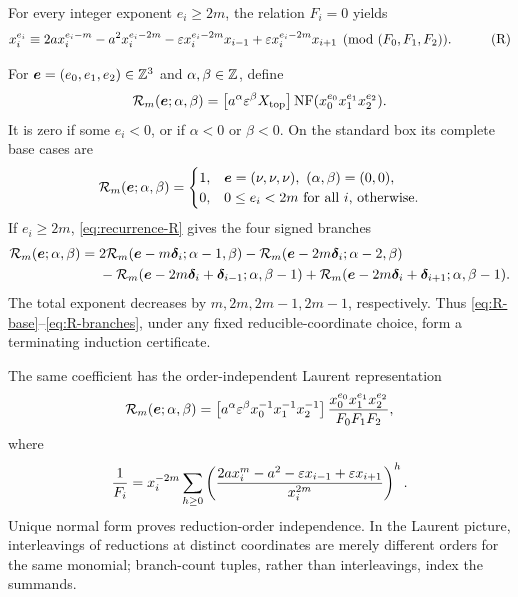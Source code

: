 \documentclass[11pt]{article}
\theoremstyle{definition}
\theoremstyle{remark}
\begin{document}
For every integer exponent \(e_i\ge2m\), the relation \(F_i=0\) yields
\begin{equation*}
\begin{aligned}
x_i^{e_i}\equiv{}&2a x_i^{e_i-m}-a^2x_i^{e_i-2m}
-\varepsilon x_i^{e_i-2m}x_{i-1}
+\varepsilon x_i^{e_i-2m}x_{i+1}
\pmod{(F_0,F_1,F_2)}.
\end{aligned}
\tag{R}\label{eq:recurrence-R}
\end{equation*}

For \(\boldsymbol{e}=(e_0,e_1,e_2)\in\mathbb{Z}^3\) and
\(\alpha,\beta\in\mathbb{Z}\), define
\begin{equation}
\mathcal{R}_m(\boldsymbol{e};\alpha,\beta)=
\left[a^\alpha\varepsilon^\beta X_{\mathrm{top}}\right]\operatorname{NF}(x_0^{e_0}x_1^{e_1}x_2^{e_2}).
\label{eq:R-state}
\end{equation}
It is zero if some \(e_i<0\), or if \(\alpha<0\) or \(\beta<0\).  On the
standard box its complete base cases are
\begin{equation}
\mathcal{R}_m(\boldsymbol{e};\alpha,\beta)=
\begin{cases}
1,&\boldsymbol{e}=(\nu,\nu,\nu),\ (\alpha,\beta)=(0,0),\\
0,&0\le e_i<2m\text{ for all }i\text{, otherwise}.
\end{cases}
\label{eq:R-base}
\end{equation}
If \(e_i\ge2m\), \eqref{eq:recurrence-R} gives the four signed branches
\begin{equation}
\begin{aligned}
\mathcal{R}_m(\boldsymbol{e};\alpha,\beta)
={}&2\mathcal{R}_m(\boldsymbol{e}-m\boldsymbol{\delta}_i;\alpha-1,\beta)
-\mathcal{R}_m(\boldsymbol{e}-2m\boldsymbol{\delta}_i;\alpha-2,\beta)\\
&-\mathcal{R}_m(\boldsymbol{e}-2m\boldsymbol{\delta}_i+\boldsymbol{\delta}_{i-1};\alpha,\beta-1)
+\mathcal{R}_m(\boldsymbol{e}-2m\boldsymbol{\delta}_i+\boldsymbol{\delta}_{i+1};\alpha,\beta-1).
\end{aligned}
\label{eq:R-branches}
\end{equation}
The total exponent decreases by \(m,2m,2m-1,2m-1\), respectively.  Thus
\eqref{eq:R-base}--\eqref{eq:R-branches}, under any fixed reducible-coordinate
choice, form a terminating induction certificate.

The same coefficient has the order-independent Laurent representation
\begin{equation}
\mathcal{R}_m(\boldsymbol{e};\alpha,\beta)=
\left[a^\alpha\varepsilon^\beta x_0^{-1}x_1^{-1}x_2^{-1}\right]\frac{x_0^{e_0}x_1^{e_1}x_2^{e_2}}{F_0F_1F_2},
\label{eq:R-laurent}
\end{equation}
where
\begin{equation}
\frac1{F_i}=x_i^{-2m}\sum_{h\ge0}
\left(
\frac{2a x_i^m-a^2-\varepsilon x_{i-1}+\varepsilon x_{i+1}}{x_i^{2m}}
\right)^h.
\label{eq:reciprocal-expansion}
\end{equation}
Unique normal form proves reduction-order independence.  In the Laurent
picture, interleavings of reductions at distinct coordinates are merely
different orders for the same monomial; branch-count tuples, rather than
interleavings, index the summands.
\end{document}
